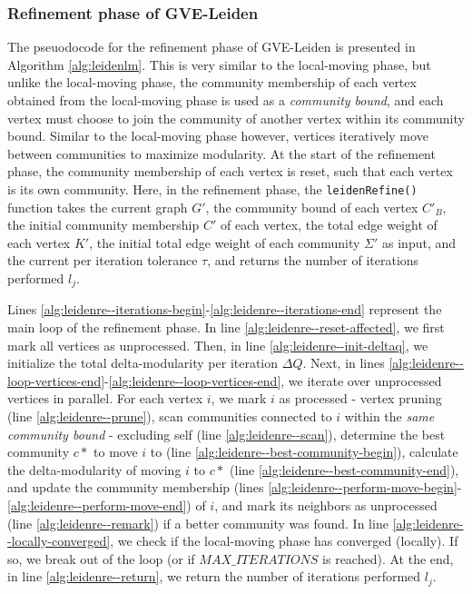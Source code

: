 \subsubsection{Refinement phase of GVE-Leiden}

The pseuodocode for the refinement phase of GVE-Leiden is presented in Algorithm \ref{alg:leidenlm}. This is very similar to the local-moving phase, but unlike the local-moving phase, the community membership of each vertex obtained from the local-moving phase is used as a \textit{community bound}, and each vertex must choose to join the community of another vertex within its community bound. Similar to the local-moving phase however, vertices iteratively move between communities to maximize modularity. At the start of the refinement phase, the community membership of each vertex is reset, such that each vertex is its own community. Here, in the refinement phase, the \texttt{leidenRefine()} function takes the current graph $G'$, the community bound of each vertex $C'_B$, the initial community membership $C'$ of each vertex, the total edge weight of each vertex $K'$, the initial total edge weight of each community $\Sigma'$ as input, and the current per iteration tolerance $\tau$, and returns the number of iterations performed $l_j$.

Lines \ref{alg:leidenre--iterations-begin}-\ref{alg:leidenre--iterations-end} represent the main loop of the refinement phase. In line \ref{alg:leidenre--reset-affected}, we first mark all vertices as unprocessed. Then, in line \ref{alg:leidenre--init-deltaq}, we initialize the total delta-modularity per iteration $\Delta Q$. Next, in lines \ref{alg:leidenre--loop-vertices-end}-\ref{alg:leidenre--loop-vertices-end}, we iterate over unprocessed vertices in parallel. For each vertex $i$, we mark $i$ as processed - vertex pruning (line \ref{alg:leidenre--prune}), scan communities connected to $i$ within the \textit{same community bound} - excluding self (line \ref{alg:leidenre--scan}), determine the best community $c*$ to move $i$ to (line \ref{alg:leidenre--best-community-begin}), calculate the delta-modularity of moving $i$ to $c*$ (line \ref{alg:leidenre--best-community-end}), and update the community membership  (lines \ref{alg:leidenre--perform-move-begin}-\ref{alg:leidenre--perform-move-end}) of $i$, and mark its neighbors as unprocessed (line \ref{alg:leidenre--remark}) if a better community was found. In line \ref{alg:leidenre--locally-converged}, we check if the local-moving phase has converged (locally). If so, we break out of the loop (or if $MAX\_ITERATIONS$ is reached). At the end, in line \ref{alg:leidenre--return}, we return the number of iterations performed $l_j$.


